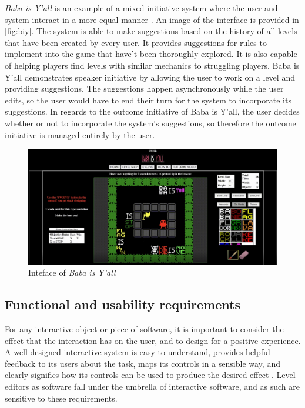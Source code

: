 \emph{Baba is Y'all} is an example of a mixed-initiative system where the user and system
interact in a more equal manner \cite{charity2020}. An image of the interface is provided in
\autoref{fig:biy}. The system is able to make suggestions based on the history of all levels
that have been created by every user. It provides suggestions for rules to implement into
the game that have't been thoroughly explored. It is also capable of helping players find
levels with similar mechanics to struggling players. Baba is Y'all demonstrates speaker
initiative by allowing the user to work on a level and providing suggestions. The
suggestions happen asynchronously while the user edits, so the user would have to end their
turn for the system to incorporate its suggestions. In regards to the outcome initiative of
Baba is Y'all, the user decides whether or not to incorporate the system's suggestions, so
therefore the outcome initiative is managed entirely by the user.

\begin{figure}[h]
    \centering
    \includegraphics[width=\linewidth]{img/fig9-biy.png}
    \caption{Inteface of \emph{Baba is Y'all}}
    \label{fig:biy}
\end{figure}

\subsection{Functional and usability requirements}

For any interactive object or piece of software, it is important to consider the effect that
the interaction has on the user, and to design for a positive experience. A well-designed
interactive system is easy to understand, provides helpful feedback to its users about the
task, maps its controls in a sensible way, and clearly signifies how its controls can be used
to produce the desired effect \cite{norman2013}. Level editors as software fall under the
umbrella of interactive software, and as such are sensitive to these requirements.

